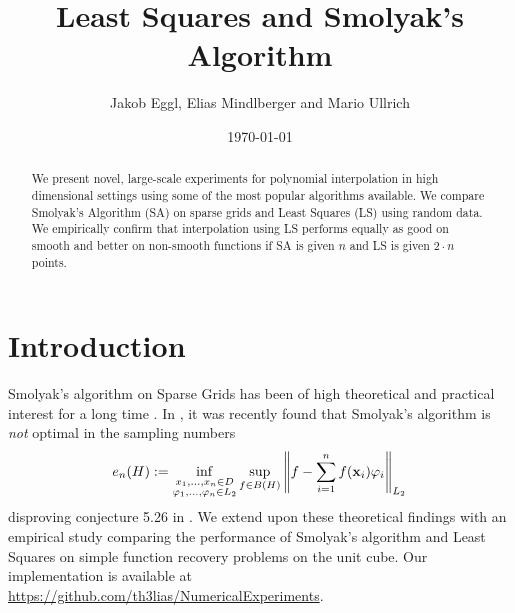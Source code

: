 \documentclass[12pt, oneside]{amsart}
\theoremstyle{definition}
\theoremstyle{remark}
\numberwithin{equation}{section}
\begin{document}
\title{Least Squares and Smolyak's Algorithm}


\author{Jakob Eggl, Elias Mindlberger and Mario Ullrich}
\date{\today}

%
%



\begin{abstract}
	We present novel, large-scale experiments for polynomial interpolation in 
	high dimensional settings using some of the most popular algorithms 
	available. 
	We compare Smolyak's Algorithm (SA) on sparse grids and Least Squares (LS) 
	using random data. We empirically confirm that interpolation using LS 
	performs equally as good on smooth and better on non-smooth functions if SA 
	is given \(n\) and LS is given \(2 \cdot n\) points.
\end{abstract}

\maketitle


\section{Introduction}

Smolyak's algorithm on Sparse Grids has been of high theoretical and practical 
interest for a long time 
\cite{BarthelmannHighDim_2000,smolyak1963,Coleman_SmoylakGithub_2013,JuddSmolyak_2014}.
 In \cite{Krieg_2020}, it was recently found that Smolyak's algorithm is 
\emph{not} optimal in the sampling numbers
\[
e_n(H) \defn \inf_{\substack{x_1, \dots, x_n \in D \\ \phi_1, \dots, \phi_n 
		\in L_2}} \sup_{f \in B(H)} \norm[L_2]{f - \sum_{i=1}^n f(\bfx_i) 
		\phi_i}
\]
disproving conjecture 5.26 in \cite{Dung_Temlyakov_Ullrich_2018}. We extend 
upon these theoretical findings with an empirical study comparing the 
performance of Smolyak's algorithm and Least Squares on simple function 
recovery problems on the unit cube. Our implementation is available at 
\url{https://github.com/th3lias/NumericalExperiments}.
\end{document}
